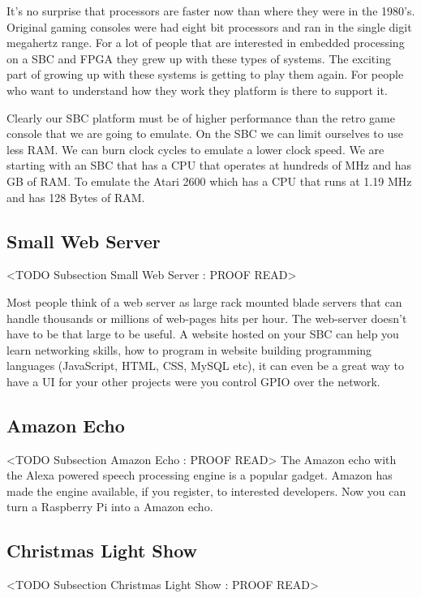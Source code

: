 It's no surprise that processors are faster now than where they were in the 1980's. Original gaming consoles were had eight bit processors and ran in the single digit megahertz range. For a lot of people that are interested in embedded processing on a \ac{SBC} and \ac{FPGA} they grew up with these types of systems. The exciting part of growing up with these systems is getting to play them again. For people who want to understand how they work they platform is there to support it.

Clearly our \ac{SBC} platform must be of higher performance than the retro game console that we are going to emulate. On the \ac{SBC} we can limit ourselves to use less \ac{RAM}. We can burn clock cycles to emulate a lower clock speed. We are starting with an \ac{SBC} that has a \ac{CPU} that operates at hundreds of \ac{MHz} and has \ac{GB} of \ac{RAM}. To emulate the Atari 2600 which has a \ac{CPU} that runs at 1.19 \ac{MHz} and has 128 Bytes of \ac{RAM}.

\subsection{Small Web Server}
	<TODO Subsection Small Web Server : PROOF READ>

Most people think of a web server as large rack mounted blade servers that can handle thousands or millions of web-pages hits per hour. The web-server doesn't have to be that large to be useful. A website hosted on your \ac{SBC} can help you learn networking skills, how to program in website building programming languages (JavaScript, \ac{HTML}, \ac{CSS}, MySQL etc), it can even be a great way to have a \ac{UI} for your other projects were you control \ac{GPIO} over the network.

\subsection{Amazon Echo}
	<TODO Subsection Amazon Echo : PROOF READ>
The Amazon echo with the Alexa powered speech processing engine is a popular gadget. Amazon has made the engine available, if you register, to interested developers. Now you can turn a Raspberry Pi into a Amazon echo. 
	
	
\subsection{Christmas Light Show}
	<TODO Subsection Christmas Light Show : PROOF READ>

